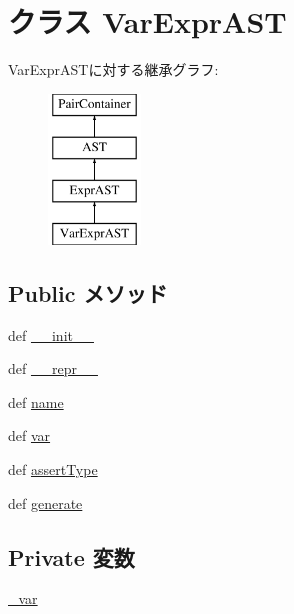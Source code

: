 \hypertarget{classslicc_1_1ast_1_1VarExprAST_1_1VarExprAST}{
\section{クラス VarExprAST}
\label{classslicc_1_1ast_1_1VarExprAST_1_1VarExprAST}
}
VarExprASTに対する継承グラフ:\begin{figure}[H]
\begin{center}
\leavevmode
\includegraphics[height=4cm]{classslicc_1_1ast_1_1VarExprAST_1_1VarExprAST}
\end{center}
\end{figure}
\subsection*{Public メソッド}
\begin{DoxyCompactItemize}
\item 
def \hyperlink{classslicc_1_1ast_1_1VarExprAST_1_1VarExprAST_ac775ee34451fdfa742b318538164070e}{\_\-\_\-init\_\-\_\-}
\item 
def \hyperlink{classslicc_1_1ast_1_1VarExprAST_1_1VarExprAST_ad8b9328939df072e4740cd9a63189744}{\_\-\_\-repr\_\-\_\-}
\item 
def \hyperlink{classslicc_1_1ast_1_1VarExprAST_1_1VarExprAST_a757840459670ee7692e00cf5ddc722d5}{name}
\item 
def \hyperlink{classslicc_1_1ast_1_1VarExprAST_1_1VarExprAST_a47bb700cb03472c187e3c8ae77941ac3}{var}
\item 
def \hyperlink{classslicc_1_1ast_1_1VarExprAST_1_1VarExprAST_aad7979207dee5627335e037dd5db9840}{assertType}
\item 
def \hyperlink{classslicc_1_1ast_1_1VarExprAST_1_1VarExprAST_a4555d1cee0dccf3942ea35fe86de2e8e}{generate}
\end{DoxyCompactItemize}
\subsection*{Private 変数}
\begin{DoxyCompactItemize}
\item 
\hyperlink{classslicc_1_1ast_1_1VarExprAST_1_1VarExprAST_a4f6c7825f9d0a389be21c303ec4d09e8}{\_\-var}
\end{DoxyCompactItemize}


